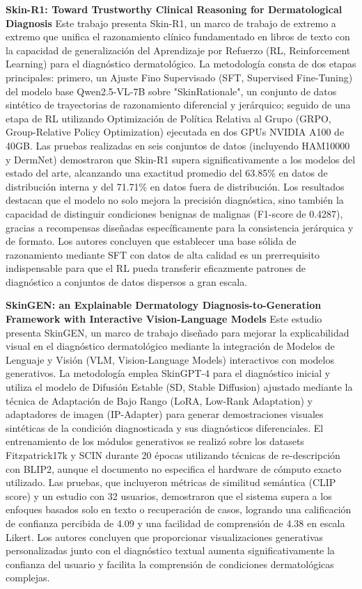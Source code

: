 \documentclass[11pt, a4paper]{article}
\begin{document}
\textbf{Skin-R1: Toward Trustworthy Clinical Reasoning for Dermatological Diagnosis} \cite{liu_skin-r1_2025}
Este trabajo presenta Skin-R1, un marco de trabajo de extremo a extremo que unifica el razonamiento clínico fundamentado en libros de texto con la capacidad de generalización del Aprendizaje por Refuerzo (RL, Reinforcement Learning) para el
diagnóstico dermatológico. La metodología consta de dos etapas principales: primero, un Ajuste Fino Supervisado (SFT, Supervised Fine-Tuning) del modelo base Qwen2.5-VL-7B sobre "SkinRationale", un conjunto de datos sintético de trayectorias
de razonamiento diferencial y jerárquico; seguido de una etapa de RL utilizando Optimización de Política Relativa al Grupo (GRPO, Group-Relative Policy Optimization) ejecutada en dos GPUs NVIDIA A100 de 40GB. Las pruebas realizadas en seis
conjuntos de datos (incluyendo HAM10000 y DermNet) demostraron que Skin-R1 supera significativamente a los modelos del estado del arte, alcanzando una exactitud promedio del 63.85\% en datos de distribución interna y del 71.71\% en datos fuera
de distribución. Los resultados destacan que el modelo no solo mejora la precisión diagnóstica, sino también la capacidad de distinguir condiciones benignas de malignas (F1-score de 0.4287), gracias a recompensas diseñadas específicamente para
la consistencia jerárquica y de formato. Los autores concluyen que establecer una base sólida de razonamiento mediante SFT con datos de alta calidad es un prerrequisito indispensable para que el RL pueda transferir eficazmente patrones de
diagnóstico a conjuntos de datos dispersos a gran escala.

\textbf{SkinGEN: an Explainable Dermatology Diagnosis-to-Generation Framework with Interactive Vision-Language Models} \cite{lin_skingen_2025}
Este estudio presenta SkinGEN, un marco de trabajo diseñado para mejorar la explicabilidad visual en el diagnóstico dermatológico mediante la integración de Modelos de Lenguaje y Visión (VLM, Vision-Language Models) interactivos con modelos
generativos. La metodología emplea SkinGPT-4 para el diagnóstico inicial y utiliza el modelo de Difusión Estable (SD, Stable Diffusion) ajustado mediante la técnica de Adaptación de Bajo Rango (LoRA, Low-Rank Adaptation) y adaptadores de 
imagen (IP-Adapter) para generar demostraciones visuales sintéticas de la condición diagnosticada y sus diagnósticos diferenciales. El entrenamiento de los módulos generativos se realizó sobre los datasets Fitzpatrick17k y SCIN durante 20
épocas utilizando técnicas de re-descripción con BLIP2, aunque el documento no especifica el hardware de cómputo exacto utilizado. Las pruebas, que incluyeron métricas de similitud semántica (CLIP score) y un estudio con 32 usuarios,
demostraron que el sistema supera a los enfoques basados solo en texto o recuperación de casos, logrando una calificación de confianza percibida de 4.09 y una facilidad de comprensión de 4.38 en escala Likert. Los autores concluyen que
proporcionar visualizaciones generativas personalizadas junto con el diagnóstico textual aumenta significativamente la confianza del usuario y facilita la comprensión de condiciones dermatológicas complejas.
\end{document}
